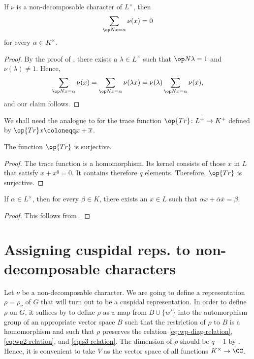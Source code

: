 \documentclass[../main.tex]{subfiles}
\begin{document}
\begin{lemma} \label{lem:sum-over-equal-norm}
	If $\nu$ is a non-decomposable character of $L^\times$, then
	\[\sum_{\op Nx=\alpha}\nu(x)=0\]
	for every $\alpha\in K^\times$.
\end{lemma}
\begin{proof}
	By the proof of , there exists a $\lambda\in L^\times$ such that $\op N\lambda=1$ and $\nu(\lambda)\ne1$. Hence,
	\[\sum_{\op Nx=\alpha}\nu(x)=\sum_{\op Nx=\alpha}\nu(\lambda x)=\nu(\lambda)\sum_{\op Nx=\alpha}\nu(x),\]
	and our claim follows.
\end{proof}

We shall need the analogue to  for the trace function $\op{Tr}\colon L^+\to K^+$ defined by $\op{Tr}x\coloneqq x+\overline x$.
\begin{lemma} \label{lem:tr-epi}
	The function $\op{Tr}$ is surjective.
\end{lemma}
\begin{proof}
	The trace function is a homomorphism. Its kernel consists of those $x$ in $L$ that satisfy $x+x^q=0$. It contains therefore $q$ elements. Therefore, $\op{Tr}$ is surjective.
\end{proof}
\begin{corollary} \label{cor:use-tr-epi}
	If $\alpha\in L^\times$, then for every $\beta\in K$, there exists an $x\in L$ such that $\alpha x+\overline\alpha\overline x=\beta$.
\end{corollary}
\begin{proof}
	This follows from .
\end{proof}

\section{Assigning cuspidal reps. to non-decomposable characters} \label{sec:def-cusp}
Let $\nu$ be a non-decomposable character. We are going to define a representation $\rho=\rho_\nu$ of $G$ that will turn out to be a cuspidal representation. In order to define $\rho$ on $G$, it suffices by  to define $\rho$ as a map from $B\cup\{w'\}$ into the automorphism group of an appropriate vector space $B$ such that the restriction of $\rho$ to $B$ is a homomorphism and such that $\rho$ preserves the relation \eqref{eq:wp-diag-relation}, \eqref{eq:wp2-relation}, and \eqref{eq:s3-relation}. The dimension of $\rho$ should be $q-1$ by . Hence, it is convenient to take $V$ as the vector space of all functions $K^\times\to\CC$.
\end{document}
